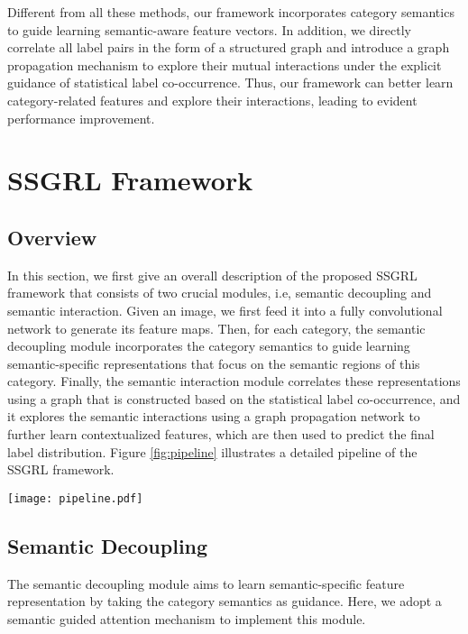\documentclass[10pt,twocolumn,letterpaper]{article}
\begin{document}
Different from all these methods, our framework incorporates category semantics to guide learning semantic-aware feature vectors. In addition, we directly correlate all label pairs in the form of a structured graph and introduce a graph propagation mechanism to explore their mutual interactions under the explicit guidance of statistical label co-occurrence. Thus, our framework can better learn category-related features and explore their interactions, leading to evident performance improvement.

\section{SSGRL Framework}
\subsection{Overview}
In this section, we first give an overall description of the proposed SSGRL framework that consists of two crucial modules, i.e, semantic decoupling and semantic interaction. Given an image, we first feed it into a fully convolutional network to generate its feature maps. Then, for each category, the semantic decoupling module incorporates the category semantics to guide learning semantic-specific representations that focus on the semantic regions of this category. Finally, the semantic interaction module correlates these representations using a graph that is constructed based on the statistical label co-occurrence, and it explores the semantic interactions using a graph propagation network to further learn contextualized features, which are then used to predict the final label distribution. Figure \ref{fig:pipeline} illustrates a detailed pipeline of the SSGRL framework.

\begin{figure*}[!t]
   \centering
   \texttt{[image: pipeline.pdf]} \caption{Illustration of our Semantic-Specific Graph Representation Learning framework. Given an input image, we first feed it into a CNN to extract image representation. Then, a semantic decoupling (SD) module incorporates category semantics to guide learning semantic-specific representations, and a semantic interaction module correlates these representations using a graph and adopts a graph neural network (GNN) to explore their interactions.}
   \label{fig:pipeline}
\end{figure*}

\subsection{Semantic Decoupling}
The semantic decoupling module aims to learn semantic-specific feature representation by taking the category semantics as guidance. Here, we adopt a semantic guided attention mechanism to implement this module.
\end{document}
